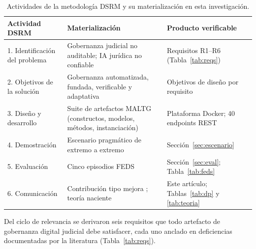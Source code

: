 \documentclass[computers,article,submit,pdftex,moreauthors]{Definitions/mdpi}
\begin{document}
\begin{table}[H]
\caption{Actividades de la metodología DSRM \cite{Peffers2007} y su materialización en esta investigación.}
\label{tab:dsrm}
\begin{tabularx}{\textwidth}{lXX}
\toprule
\textbf{Actividad DSRM} & \textbf{Materialización} & \textbf{Producto verificable}\\
\midrule
1. Identificación del problema & Gobernanza judicial no auditable; IA jurídica no confiable \cite{Rosa2013,Dahl2024} & Requisitos R1--R6 (Tabla~\ref{tab:reqs})\\
2. Objetivos de la solución & Gobernanza automatizada, fundada, verificable y adaptativa & Objetivos de diseño por requisito\\
3. Diseño y desarrollo & Suite de artefactos MALTG (constructos, modelos, métodos, instanciación) & Plataforma Docker; 40 endpoints REST\\
4. Demostración & Escenario pragmático de extremo a extremo & Sección~\ref{sec:escenario}\\
5. Evaluación & Cinco episodios FEDS \cite{Venable2016} & Sección~\ref{sec:eval}; Tabla~\ref{tab:feds}\\
6. Comunicación & Contribución tipo mejora \cite{Gregor2013}; teoría naciente \cite{GregorJones2007} & Este artículo; Tablas~\ref{tab:dp} y \ref{tab:teoria}\\
\bottomrule
\end{tabularx}
\end{table}

Del ciclo de relevancia se derivaron seis requisitos que todo artefacto de gobernanza digital judicial debe satisfacer, cada uno anclado en deficiencias documentadas por la literatura (Tabla~\ref{tab:reqs}).
\end{document}
